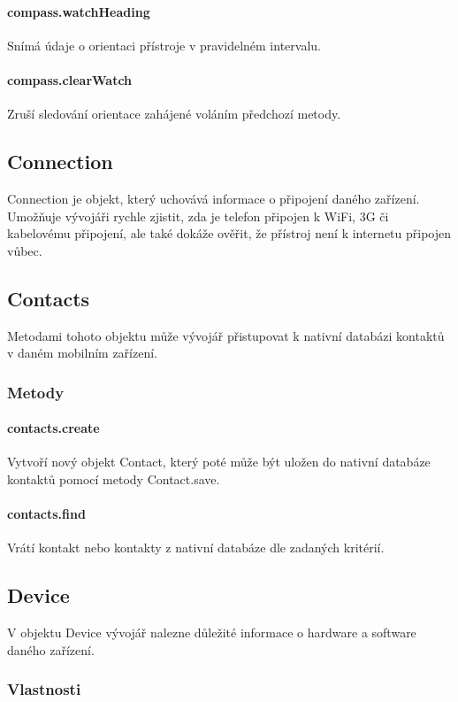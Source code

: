 \paragraph{compass.watchHeading}
Snímá údaje o orientaci přístroje v pravidelném intervalu.

\paragraph{compass.clearWatch}
Zruší sledování orientace zahájené voláním předchozí metody.

\subsection{Connection}
Connection je objekt, který uchovává informace o připojení daného zařízení. Umožňuje vývojáři rychle zjistit, zda je telefon připojen k WiFi, 3G či kabelovému připojení, ale také dokáže ověřit, že přístroj není k internetu připojen vůbec.

\subsection{Contacts}
Metodami tohoto objektu může vývojář přistupovat k nativní databázi kontaktů v daném mobilním zařízení.

\subsubsection{Metody}
\paragraph{contacts.create}
Vytvoří nový objekt Contact, který poté může být uložen do nativní databáze kontaktů pomocí metody Contact.save.

\paragraph{contacts.find}
Vrátí kontakt nebo kontakty z nativní databáze dle zadaných kritérií.

\subsection{Device}
V objektu Device vývojář nalezne důležité informace o hardware a software daného zařízení.

\subsubsection{Vlastnosti}
